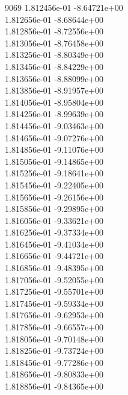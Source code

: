 9069	1.812456e-01	-8.64721e+00	\\ 	1.812656e-01	-8.68644e+00	\\ 	1.812856e-01	-8.72556e+00	\\ 	1.813056e-01	-8.76458e+00	\\ 	1.813256e-01	-8.80349e+00	\\ 	1.813456e-01	-8.84229e+00	\\ 	1.813656e-01	-8.88099e+00	\\ 	1.813856e-01	-8.91957e+00	\\ 	1.814056e-01	-8.95804e+00	\\ 	1.814256e-01	-8.99639e+00	\\ 	1.814456e-01	-9.03463e+00	\\ 	1.814656e-01	-9.07276e+00	\\ 	1.814856e-01	-9.11076e+00	\\ 	1.815056e-01	-9.14865e+00	\\ 	1.815256e-01	-9.18641e+00	\\ 	1.815456e-01	-9.22405e+00	\\ 	1.815656e-01	-9.26156e+00	\\ 	1.815856e-01	-9.29895e+00	\\ 	1.816056e-01	-9.33621e+00	\\ 	1.816256e-01	-9.37334e+00	\\ 	1.816456e-01	-9.41034e+00	\\ 	1.816656e-01	-9.44721e+00	\\ 	1.816856e-01	-9.48395e+00	\\ 	1.817056e-01	-9.52055e+00	\\ 	1.817256e-01	-9.55701e+00	\\ 	1.817456e-01	-9.59334e+00	\\ 	1.817656e-01	-9.62953e+00	\\ 	1.817856e-01	-9.66557e+00	\\ 	1.818056e-01	-9.70148e+00	\\ 	1.818256e-01	-9.73724e+00	\\ 	1.818456e-01	-9.77286e+00	\\ 	1.818656e-01	-9.80833e+00	\\ 	1.818856e-01	-9.84365e+00	\\ \hline
